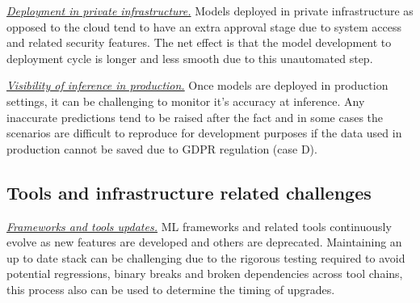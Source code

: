 \underline{\emph{Deployment in private infrastructure.}} Models deployed in private infrastructure as opposed to the cloud tend to have an extra approval stage due to system access and related security features. The net effect is that the model development to deployment cycle is longer and less smooth due to this unautomated step.

\underline{\emph{Visibility of inference in production.}} Once models are deployed in production settings, it can be challenging to monitor it's accuracy at inference. Any inaccurate predictions tend to be raised after the fact and in some cases the scenarios are difficult to reproduce for development purposes if the data used in production cannot be saved due to GDPR regulation (case D).

\subsection{Tools and infrastructure related challenges}

\underline{\emph{Frameworks and tools updates.}} ML frameworks and related tools continuously evolve as new features are developed and others are deprecated. Maintaining an up to date stack can be challenging due to the rigorous testing required to avoid potential regressions, binary breaks and broken dependencies across tool chains, this process also can be used to determine the timing of upgrades.

